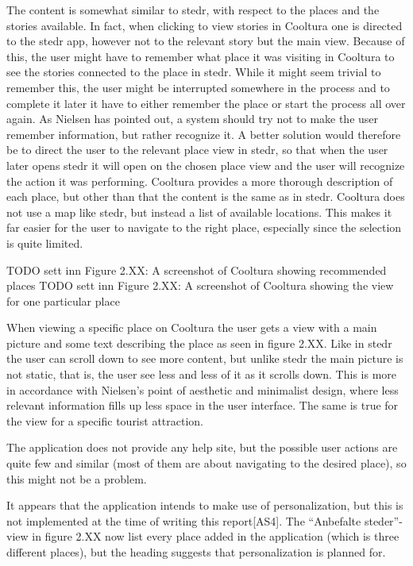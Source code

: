 The content is somewhat similar to stedr, with respect to the places and the stories available. In fact, when clicking to view stories in Cooltura one is directed to the stedr app, however not to the relevant story but the main view. Because of this, the user might have to remember what place it was visiting in Cooltura to see the stories connected to the place in stedr. While it might seem trivial to remember this, the user might be interrupted somewhere in the process and to complete it later it have to either remember the place or start the process all over again. As Nielsen has pointed out, a system should try not to make the user remember information, but rather recognize it. A better solution would therefore be to direct the user to the relevant place view in stedr, so that when the user later opens stedr it will open on the chosen place view and the user will recognize the action it was performing. Cooltura provides a more thorough description of each place, but other than that the content is the same as in stedr. Cooltura does not use a map like stedr, but instead a list of available locations. This makes it far easier for the user to navigate to the right place, especially since the selection is quite limited. \newline

TODO sett inn Figure 2.XX: A screenshot of Cooltura showing recommended places
TODO sett inn Figure 2.XX: A screenshot of Cooltura showing the view for one particular place

When viewing a specific place on Cooltura the user gets a view with a main picture and some text describing the place as seen in figure 2.XX. Like in stedr the user can scroll down to see more content, but unlike stedr the main picture is not static, that is, the user see less and less of it as it scrolls down. This is more in accordance with Nielsen’s point of aesthetic and minimalist design, where less relevant information fills up less space in the user interface. The same is true for the view for a specific tourist attraction. \newline

The application does not provide any help site, but the possible user actions are quite few and similar (most of them are about navigating to the desired place), so this might not be a problem. \newline

It appears that the application intends to make use of personalization, but this is not implemented at the time of writing this report[AS4]. The “Anbefalte steder”-view in figure 2.XX now list every place added in the application (which is three different places), but the heading suggests that personalization is planned for. 


